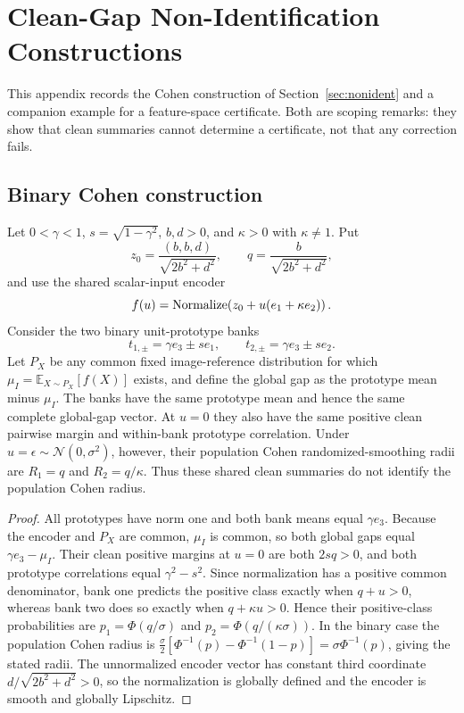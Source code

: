 \section{Clean-Gap Non-Identification Constructions}
\label{app:nonident}

This appendix records the Cohen construction of Section~\ref{sec:nonident} and
a companion example for a feature-space certificate. Both are scoping remarks:
they show that clean summaries cannot determine a certificate, not that any
correction fails.

\subsection{Binary Cohen construction}
\label{app:cohen}

\begin{proposition}
\label{prop:nonident}
Let $0<\gamma<1$, $s=\sqrt{1-\gamma^2}$, $b,d>0$, and
$\kappa>0$ with $\kappa\neq1$.  Put
\[
 z_0=\frac{(b,b,d)}{\sqrt{2b^2+d^2}},\qquad
 q=\frac{b}{\sqrt{2b^2+d^2}},
\]
and use the shared scalar-input encoder
\[
 f(u)=\operatorname{Normalize}\!\left(z_0+u(e_1+\kappa e_2)\right).
\]
Consider the two binary unit-prototype banks
\[
 t_{1,\pm}=\gamma e_3\pm s e_1,
 \qquad
 t_{2,\pm}=\gamma e_3\pm s e_2.
\]
Let $P_X$ be any common fixed image-reference distribution for which
$\mu_I=\mathbb E_{X\sim P_X}[f(X)]$ exists, and define the global gap as the
prototype mean minus $\mu_I$.  The banks have the same prototype mean and
hence the same complete global-gap vector.  At $u=0$ they also have the same
positive clean pairwise margin and within-bank prototype correlation.  Under
$u=\epsilon\sim\mathcal N(0,\sigma^2)$, however, their population Cohen
randomized-smoothing radii are $R_1=q$ and $R_2=q/\kappa$.  Thus these shared
clean summaries do not identify the population Cohen radius.
\end{proposition}

\begin{proof}
All prototypes have norm one and both bank means equal $\gamma e_3$.  Because
the encoder and $P_X$ are common, $\mu_I$ is common, so both global gaps equal
$\gamma e_3-\mu_I$.  Their clean positive margins at $u=0$ are both $2sq>0$,
and both prototype correlations equal $\gamma^2-s^2$.  Since normalization has
a positive common denominator, bank one predicts the positive class exactly
when $q+u>0$, whereas bank two does so exactly when $q+\kappa u>0$.  Hence
their positive-class probabilities are $p_1=\Phi(q/\sigma)$ and
$p_2=\Phi(q/(\kappa\sigma))$.  In the binary case the population Cohen radius
is $\frac{\sigma}{2}[\Phi^{-1}(p)-\Phi^{-1}(1-p)]=\sigma\Phi^{-1}(p)$, giving
the stated radii.  The unnormalized encoder vector has constant third
coordinate $d/\sqrt{2b^2+d^2}>0$, so the normalization is globally defined and
the encoder is smooth and globally Lipschitz.
\end{proof}

